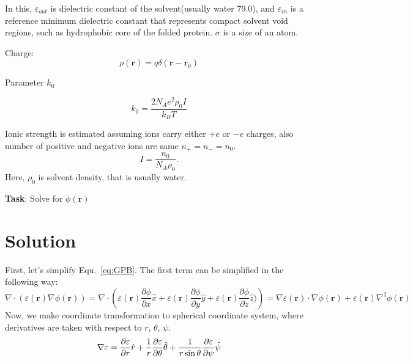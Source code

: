 \documentclass{article}
\begin{document}
In this, $\varepsilon_{out}$ is dielectric constant of the solvent(usually water 79.0), and
$\varepsilon_{in}$ is a reference minimum dielectric constant that represents compact solvent void regions, 
such as hydrophobic core of the folded protein. $\sigma$ is a size of an atom. \newline

Charge:
\begin{equation}
  \label{eq:Charge}
    \rho(\mathbf{r}) = q\delta(\mathbf{r} - \mathbf{r}_0)
\end{equation}

Parameter $k_0$

\begin{equation}
  \label{eq:k0}
    k_{0} = \frac{2 N_{A} e^2 \rho_{0} I}{k_B T} 
\end{equation}

Ionic strength is estimated assuming ions carry either $+e$ or $-e$ charges, also
number of positive and negative ions are same $n_{+} = n_{-} = n_0$.
\begin{equation}
  \label{eq:IonStrength}
    I = \frac{n_0}{N_A \rho_0}.
\end{equation}
Here, $\rho_0$ is solvent density, that is usually water.

\textbf{Task}: Solve for $\phi(\mathbf{r})$

\section{Solution}

First, let's simplify Equ.~\ref{eq:GPB}. The first term can be simplified in the following way:
\begin{equation}
    \label{eq:PBTerm1}
        \nabla \cdot \left( \varepsilon(\mathbf{r}) \nabla \phi(\mathbf{r}) \right) = 
        \nabla \cdot \left( \varepsilon(\mathbf{r}) \frac{\partial \phi}{\partial x}   \hat{x} +
        \varepsilon(\mathbf{r}) \frac{\partial\phi}{\partial y} \hat{y} +
        \varepsilon(\mathbf{r}) \frac{\partial \phi}{\partial z} \hat{z}) \right) = 
        \nabla \varepsilon(\mathbf{r}) \cdot \nabla \phi(\mathbf{r}) +
        \varepsilon(\mathbf{r}) \nabla^2 \phi(\mathbf{r})
\end{equation}
Now, we make coordinate transformation to spherical coordinate system, where derivatives
are taken with respect to $r$, $\theta$, $\psi$.
\begin{equation}
  \label{eq:DelEps}
    \nabla \varepsilon = \frac{\partial \varepsilon}{\partial r} \hat{r} +
    \frac{1}{r} \frac{\partial \varepsilon}{\partial \theta} \hat{\theta} +
    \frac{1}{r \sin{\theta}} \frac{\partial \varepsilon}{\partial \psi} \hat{\psi} \\
\end{equation}
\end{document}
